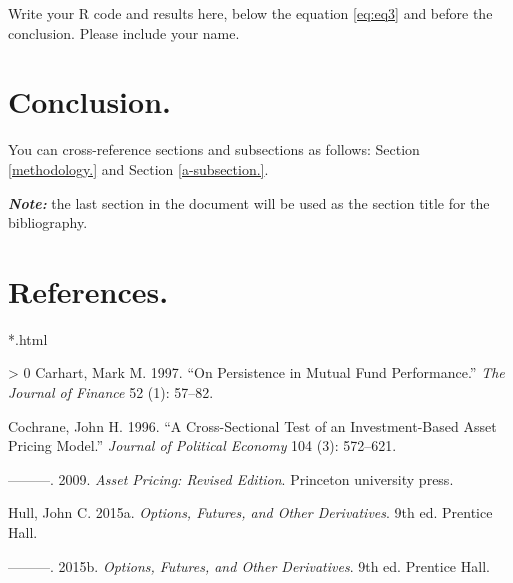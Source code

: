 \documentclass[12pt,halfline,a4paper,]{ouparticle}
\newlength{\cslhangindent}
\newenvironment{CSLReferences}[3] %
 {%
  \setlength{\parindent}{0pt}
  \ifodd #1 \everypar{\setlength{\hangindent}{\cslhangindent}}\ignorespaces\fi
  \ifnum #2 > 0
  \setlength{\parskip}{#2\baselineskip}
  \fi
 }%
 {}
\begin{document}
Write your R code and results here, below the equation \ref{eq:eq3} and
before the conclusion. Please include your name.

\hypertarget{conclusion.}{%
\section{Conclusion.}\label{conclusion.}}

You can cross-reference sections and subsections as follows: Section
\ref{methodology.} and Section \ref{a-subsection.}.

\textbf{\emph{Note:}} the last section in the document will be used as
the section title for the bibliography.

\hypertarget{references.}{%
\section{References.}\label{references.}}

*.html

\hypertarget{refs}{}
\begin{CSLReferences}{1}{0}
\leavevmode\hypertarget{ref-carhart1997persistence}{}%
Carhart, Mark M. 1997. {``On Persistence in Mutual Fund Performance.''}
\emph{The Journal of Finance} 52 (1): 57--82.

\leavevmode\hypertarget{ref-cochrane1996cross}{}%
Cochrane, John H. 1996. {``A Cross-Sectional Test of an Investment-Based
Asset Pricing Model.''} \emph{Journal of Political Economy} 104 (3):
572--621.

\leavevmode\hypertarget{ref-cochrane2009asset}{}%
---------. 2009. \emph{Asset Pricing: Revised Edition}. Princeton
university press.

\leavevmode\hypertarget{ref-Hull}{}%
Hull, John C. 2015a. \emph{Options, Futures, and Other Derivatives}. 9th
ed. Prentice Hall.

\leavevmode\hypertarget{ref-Hull2}{}%
---------. 2015b. \emph{Options, Futures, and Other Derivatives}. 9th
ed. Prentice Hall.

\end{CSLReferences}
\end{document}

